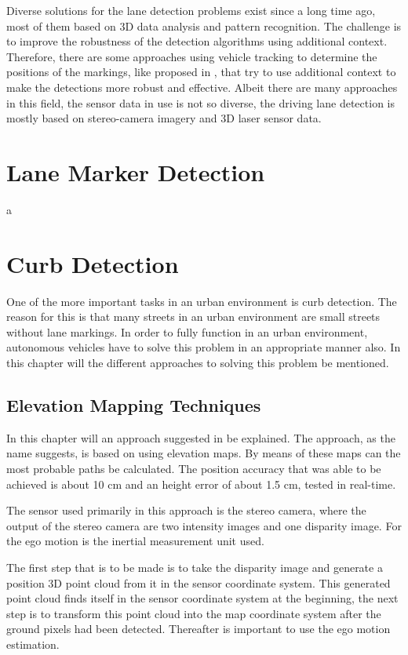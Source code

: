 \documentclass[conference]{IEEEtran}
\begin{document}
Diverse solutions for the lane detection problems exist since a long time ago, most of them based on 3D data analysis and pattern recognition. The challenge is to improve the robustness of the detection algorithms using additional context. Therefore, there are some approaches using vehicle tracking to determine the positions of the markings, like proposed in \cite{virtuallane}, that try to use additional context to make the detections more robust and effective. Albeit there are many approaches in this field, the sensor data in use is not so diverse, the driving lane detection is mostly based on stereo-camera imagery and 3D laser sensor data.


\section{Lane Marker Detection}
a

\section{Curb Detection}

One of the more important tasks in an urban environment is curb detection. The reason for this is that many streets in an urban environment are small streets without lane markings. In order to fully function in an urban environment, autonomous vehicles have to solve this problem in an appropriate manner also. In this chapter will the different approaches to solving this problem be mentioned.  

\subsection{Elevation Mapping Techniques}

In this chapter will an approach suggested in \cite{stereo} be explained. The approach, as the name suggests, is based on using elevation maps. By means of these maps can the most probable paths be calculated. The position accuracy that was able to be achieved is about 10 cm and an height error of about 1.5 cm, tested in real-time.

The sensor used primarily in this approach is the stereo camera, where the output of the stereo camera are two intensity images and one disparity image. For the ego motion is the inertial measurement unit used. 

The first step that is to be made is to take the disparity image and generate a position 3D point cloud from it in the sensor coordinate system. This generated point cloud finds itself in the sensor coordinate system at the beginning, the next step is to transform this point cloud into the map coordinate system after the ground pixels had been detected. Thereafter is important to use the ego motion estimation. 
\end{document}
